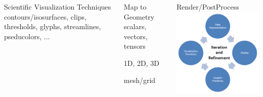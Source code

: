 \begin{frame}
\begin{small}
\begin{columns}
\begin{column}{3.85cm}
\begin{beamerboxesrounded}[upper=block head,lower=block body,shadow=true]{\textcolor{DarkRed}{} Scientific Visualization Techniques}
        \textcolor{DarkRed}{} contours/isosurfaces, clips, thresholds, glyphs, streamlines, pseducolors, ...
\end{beamerboxesrounded}
\end{column}
\begin{column}{3.85cm}
\begin{beamerboxesrounded}[upper=block head,lower=block body,shadow=true]{\textcolor{DarkRed}{} Map to Geometry}
        \textcolor{DarkRed}{} scalars, vectors, tensors

        \textcolor{DarkRed}{} 1D, 2D, 3D

        \textcolor{DarkRed}{} mesh/grid
\end{beamerboxesrounded}
\end{column}
\begin{column}{3.85cm}
\begin{beamerboxesrounded}[upper=block head,lower=block body,shadow=true]{\textcolor{DarkRed}{} Render/PostProcess}
        \centering
        \includegraphics[width=.75\columnwidth]{figs/viz/render}
\end{beamerboxesrounded}
\end{column}
\end{columns}
\end{small}
\end{frame}



